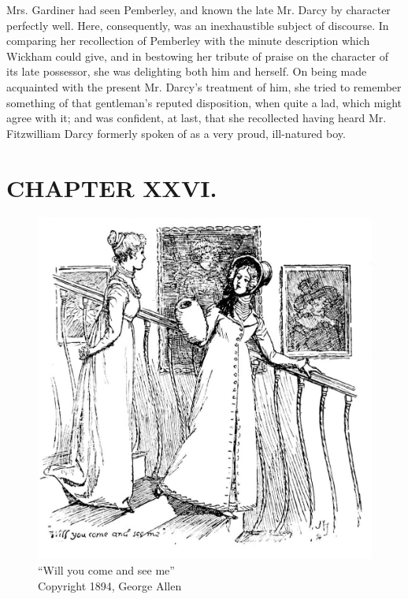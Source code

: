 Mrs. Gardiner had seen Pemberley, and known the late Mr. Darcy by character perfectly well. Here, consequently, was an inexhaustible subject of discourse. In comparing her recollection of Pemberley with the minute description which Wickham could give, and in bestowing her tribute of praise on the character of its late possessor, she was delighting both him and herself. On being made acquainted with the present Mr. Darcy's treatment of him, she tried to remember something of that gentleman's reputed disposition, when quite a lad, which might agree with it; and was confident, at last, that she recollected having heard Mr. Fitzwilliam Darcy formerly spoken of as a very proud, ill-natured boy.



\chapter{CHAPTER XXVI.}

\begin{figure}[htbp]
    \centering
    \includegraphics[width=\textwidth]{illustrations/i_210_a.jpg}
    \caption{“Will you come and see me”\\ Copyright 1894, George Allen}
    \label{fig:image}
\end{figure}


